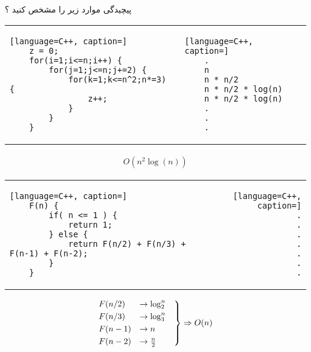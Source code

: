 \documentclass[12pt]{article}
\begin{document}
\newpage


\noindent
پیچیدگی موارد زیر را مشخص کنید ؟



\begin{latin}
\begin{center}
  \bgroup
  \def\arraystretch{1.5}%
  \begin{tabular}{ E  B  }
	\begin{lstlisting}[language=C++, caption=]
	z = 0;
	for(i=1;i<=n;i++) {
		for(j=1;j<=n;j+=2) {
			for(k=1;k<=n^2;n*=3) {
				z++;
			}
		}
	}
	\end{lstlisting}
     &  
	\begin{lstlisting}[language=C++, caption=]
	.
	n
	n * n/2
	n * n/2 * log(n)
	n * n/2 * log(n)
	.
	.
	.
	\end{lstlisting}
  \end{tabular}
  \egroup
\end{center}
\end{latin}


\begin{tcolorbox}
\Large
\begin{align*}
O(n^{2}\log{(n)})
\end{align*}
\end{tcolorbox}



\begin{latin}
\begin{center}
  \bgroup
  \def\arraystretch{1.5}%
  \begin{tabular}{ I  D  }
	\begin{lstlisting}[language=C++, caption=]
	F(n) {
		if( n <= 1 ) {
			return 1;
		} else {
			return F(n/2) + F(n/3) + F(n-1) + F(n-2);
		}
	}
	\end{lstlisting}
     &  
	\begin{lstlisting}[language=C++, caption=]
	.
	.
	.
	.
	.
	.
	.
	\end{lstlisting}
  \end{tabular}
  \egroup
\end{center}
\end{latin}


\begin{tcolorbox}
\begin{align*}
\begin{rcases}
F(n/2) &\to \log^{n}_{2} \quad \\
F(n/3) &\to \log^{n}_{3} \\
F(n-1) &\to n \\
F(n-2) &\to \frac{n}{2} \\
\end{rcases} \Rightarrow 
O(n)
\end{align*}
\end{tcolorbox}
\end{document}
